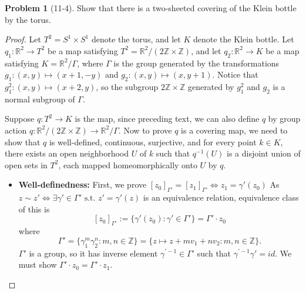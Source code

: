 \documentclass[11pt, a4paper]{article}
\theoremstyle{definition}
\newtheorem{prob}{Problem}
\newenvironment{problem}[1][]{\begin{prob}[#1]\normalfont}{\end{prob}\vspace{1.5em}}
\begin{document}
\begin{problem}[11-4]
Show that there is a two-sheeted covering of the Klein bottle by the torus.
\begin{proof}
Let $T^2 = S^1 \times S^1$ denote the torus, and let $K$ denote the Klein bottle. Let $q_1: \mathbb{R}^2 \to T^2$ 
be a map satisfying $T^2 = \mathbb{R}^2 / (2\mathbb{Z}\times \mathbb{Z})$, and let $q_2: \mathbb{R}^2 \to K$ be a 
map satisfying $K = \mathbb{R}^2 / \varGamma $, where $\varGamma$ is the group generated by the transformations 
$g_1:(x,y) \mapsto (x+1,-y)$ and $g_2:(x,y) \mapsto (x,y+1)$. Notice that $g_1^2:(x,y) \mapsto (x+2,y)$, 
so the subgroup $2\mathbb{Z}\times \mathbb{Z}$ generated by $g_1^2$ and $g_2$ is a normal subgroup of $\varGamma$. 


Suppose $q: T^2 \to K$ is the map, since preceding text, we can also define $q$ by group action
$q:\mathbb{R}^2 / (2\mathbb{Z}\times \mathbb{Z}) \to \mathbb{R}^2 / \varGamma $. Now to prove $q$ is a covering map,
we need to show that $q$ is well-defined, continuous, surjective, and for every point $k \in K$, there exists an 
open neighborhood $U$ of $k$ such that $q^{-1}(U)$ is a disjoint union of open sets in $T^2$, each mapped 
homeomorphically onto $U$ by $q$.

\begin{itemize}
    \item[$1^\circ$] \textbf{Well-definedness:} First, we prove $[z_0]_{\Gamma'} = [z_1]_{\Gamma'} \Leftrightarrow  z_1 = \gamma'(z_0)$
    As $z\sim z' \iff \exists \gamma' \in \Gamma' \text{ s.t. } z' = \gamma'(z)$ is an equivalence relation, 
    equivalence class of this is 
    $$[z_0]_{\Gamma'}:=\{\gamma'(z_0) : \gamma' \in \Gamma'\} = \Gamma'\cdot z_0$$
    where 
    $$\Gamma'=\{\gamma _{1}^{m}\gamma _{2}^{n}:m,n\in \mathbb{Z}\}=\{z\mapsto z+mv_1+nv_2: m,n\in \mathbb{Z}\}.$$ 
    $\Gamma'$ is a group, so it has inverse element $\gamma ^{'-1} \in \Gamma'$ such that $\gamma ^{'-1}\gamma' = id$. 
    We must show $\Gamma' \cdot z_0 = \Gamma' \cdot z_1$.


\end{itemize}
\end{proof}
\end{problem}
\end{document}
